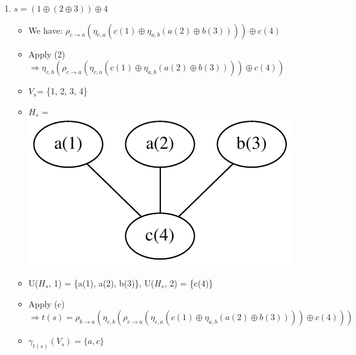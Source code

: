 \documentclass[a4paper, 12pt]{article}
\begin{document}
\begin{enumerate}
\item $s=(1\oplus(2\oplus3))\oplus4$
\begin{itemize}
\item We have: $\rho_{c\rightarrow a}(\eta_{c,a}(c(1)\oplus\eta_{a,b}(a(2)\oplus b(3))))\oplus c(4)$
\item Apply (2) $\Longrightarrow\eta_{c,b}(\rho_{c\rightarrow a}(\eta_{c,a}(c(1)\oplus\eta_{a,b}(a(2)\oplus b(3))))\oplus c(4))$
\item {$V_s$}= \{1, 2, 3, 4\} 
\item {$H_s$} = \includegraphics[scale=0.5]{image/example5}
\item U({$H_s$}, 1) = \{a(1), a(2), b(3)\}, U({$H_s$},
2) = \{c(4)\} 
\item Apply (c) $\Longrightarrow t(s)=\rho_{b\rightarrow a}(\eta_{c,b}(\rho_{c\rightarrow a}(\eta_{c,a}(c(1)\oplus\eta_{a,b}(a(2)\oplus b(3))))\oplus c(4)))$ 
\item $\gamma_{t(s)}(V_{s})=\{a,c\}$ 
\end{itemize}


\end{enumerate}
\end{document}
